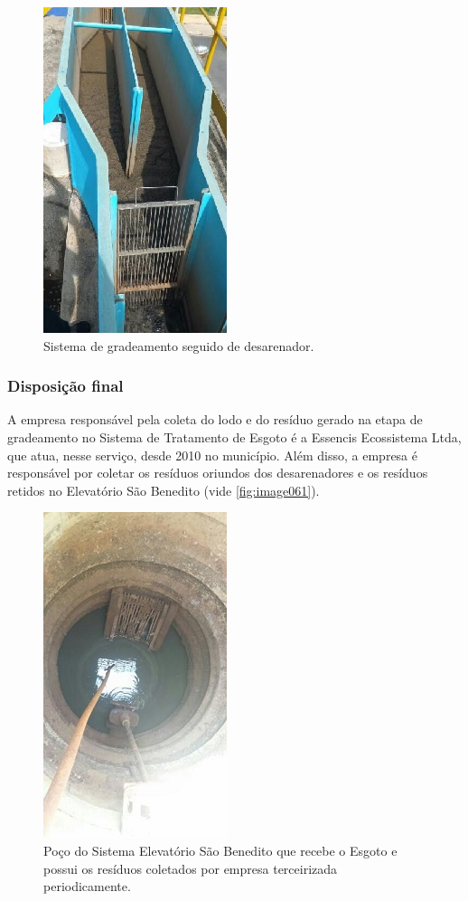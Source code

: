 \begin{figure}
	\centering
	\includegraphics[width=0.25\linewidth]{produtos/prodtres/image060}
	\caption{Sistema de gradeamento seguido de desarenador.}
	\label{fig:image060}
\end{figure}


\subsubsection{Disposição final}

A empresa responsável pela coleta do lodo e do resíduo gerado na etapa de gradeamento no Sistema de Tratamento de Esgoto é a Essencis Ecossistema Ltda, que atua, nesse serviço, desde 2010 no município. Além disso, a empresa é responsável por coletar os resíduos oriundos dos desarenadores e os resíduos retidos no Elevatório São Benedito (vide \autoref{fig:image061}). 

\begin{figure}
	\centering
	\includegraphics[width=0.25\linewidth]{produtos/prodtres/image061}
	\caption{Poço do Sistema Elevatório São Benedito que recebe o Esgoto e possui os resíduos coletados por empresa terceirizada periodicamente.}
	\label{fig:image061}
\end{figure}


